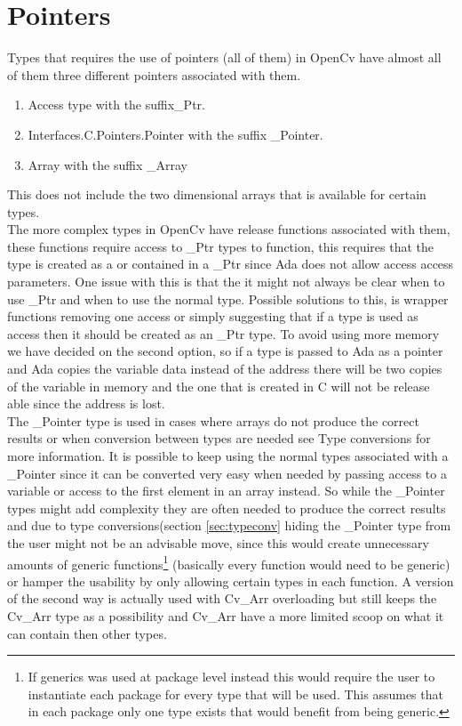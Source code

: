 \section{Pointers}\label{sec:pointersdesign}
Types that requires the use of pointers (all of them) in OpenCv have almost all of them three different pointers associated with them.
\begin{enumerate}
\item Access type with the suffix_Ptr.
\item Interfaces.C.Pointers.Pointer with the suffix _Pointer.
\item Array with the suffix _Array
\end{enumerate}
This does not include the two dimensional arrays that is available for certain types.
\\
The more complex types in OpenCv have release functions associated with them, these functions require access to _Ptr types to function, this requires that the type is created as a or contained in a _Ptr since Ada does not allow access access parameters. One issue with this is that the it might not always be clear when to use _Ptr and when to use the normal type. Possible solutions to this, is wrapper functions removing one access or simply suggesting that if a type is used as access then it should be created as an _Ptr type. To avoid using more memory we have decided on the second option, so if a type is passed to Ada as a pointer and Ada copies the variable data instead of the address there will be two copies of the variable in memory and the one that is created in C will not be release able since the address is lost.
\\
The _Pointer type is used in cases where arrays do not produce the correct results or when conversion between types are needed see Type conversions for more information. It is possible to keep using the normal types associated with a _Pointer since it can be converted very easy when needed by passing access to a variable or access to the first element in an array instead. So while the _Pointer types might add complexity they are often needed to produce the correct results and due to type conversions(section \ref{sec:typeconv} hiding the _Pointer type from the user might not be an advisable move, since this would create unnecessary amounts of generic functions\footnote{If generics was used at package level instead this would require the user to instantiate each package for every type that will be used. This assumes that in each package only one type exists that would benefit from being generic.} (basically every function would need to be generic) or hamper the usability by only allowing certain types in each function. A version of the second way is actually used with Cv_Arr overloading but still keeps the Cv_Arr type as a possibility and Cv_Arr have a more limited scoop on what it can contain then other types.
